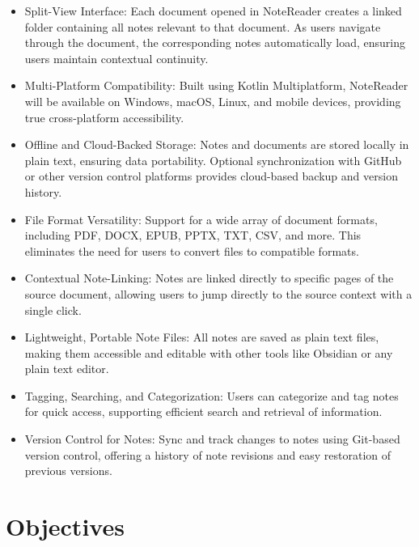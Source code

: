 \begin{itemize}
    \item Split-View Interface: Each document opened in NoteReader creates a linked folder containing all notes relevant to that document. As users navigate through the document, the corresponding notes automatically load, ensuring users maintain contextual continuity.
    \item Multi-Platform Compatibility: Built using Kotlin Multiplatform, NoteReader will be available on Windows, macOS, Linux, and mobile devices, providing true cross-platform accessibility.
    \item Offline and Cloud-Backed Storage: Notes and documents are stored locally in plain text, ensuring data portability. Optional synchronization with GitHub or other version control platforms provides cloud-based backup and version history.
    \item File Format Versatility: Support for a wide array of document formats, including PDF, DOCX, EPUB, PPTX, TXT, CSV, and more. This eliminates the need for users to convert files to compatible formats.
    \item Contextual Note-Linking: Notes are linked directly to specific pages of the source document, allowing users to jump directly to the source context with a single click.
    \item Lightweight, Portable Note Files: All notes are saved as plain text files, making them accessible and editable with other tools like Obsidian or any plain text editor.
    \item Tagging, Searching, and Categorization: Users can categorize and tag notes for quick access, supporting efficient search and retrieval of information.
    \item Version Control for Notes: Sync and track changes to notes using Git-based version control, offering a history of note revisions and easy restoration of previous versions.
\end{itemize}

\section{Objectives}
